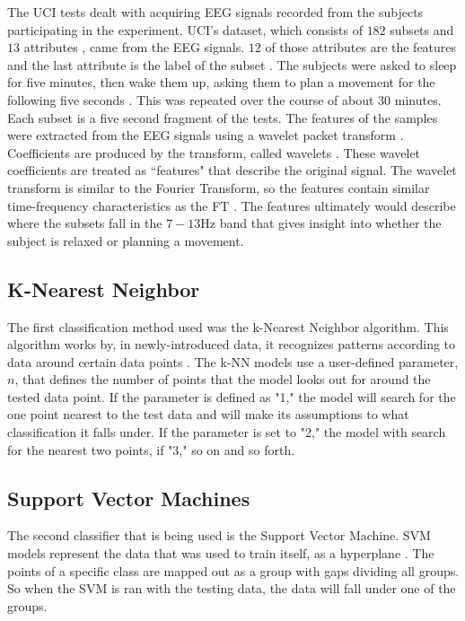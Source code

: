 \documentclass[conference,compsoc]{IEEEtran}
\begin{document}
The UCI tests dealt with acquiring EEG signals recorded from the subjects participating in the experiment.  UCI's dataset, which consists of $182$ subsets and $13$ attributes \cite{classsvm}, came from the EEG signals. $12$ of those attributes are the features and the last attribute is the label of the subset \cite{online}. 
The subjects were asked to sleep for five minutes, then wake them up, asking them to plan a movement for the following five seconds \cite{classsvm}. This was repeated over the course of about 30 minutes. Each subset is a five second fragment of the tests. The features of the samples were extracted from the EEG signals using a wavelet packet transform \cite{online}. 
Coefficients are produced by the transform, called wavelets \cite{wavelet}. These wavelet coefficients are treated as ``features" that describe the original signal.
The wavelet transform is similar to the Fourier Transform, so the features contain similar time-frequency characteristics as the FT \cite{packet}. 
The features ultimately would describe where the subsets fall in the $7-13\si{\hertz}$ band that gives insight into whether the subject is relaxed or planning a movement.
\subsection{K-Nearest Neighbor}
The first classification method used was the k-Nearest Neighbor algorithm.  This algorithm works by, in newly-introduced data, it recognizes patterns according to data around certain data points \cite{random}. The k-NN models use a user-defined parameter, $n$, that defines the number of points that the model looks out for around the tested data point. If the parameter is defined as "1," the model will search for the one point nearest to the test data and will make its assumptions to what classification it falls under. If the parameter is set to "2," the model with search for the nearest two points, if "3," so on and so forth.   

\subsection{Support Vector Machines}
The second classifier that is being used is the Support Vector Machine. SVM models represent the data that was used to train itself, as a hyperplane \cite{classsvm}. The points of a specific class are mapped out as a group with gaps dividing all groups. So when the SVM is ran with the testing data, the data will fall under one of the groups. 
\end{document}
